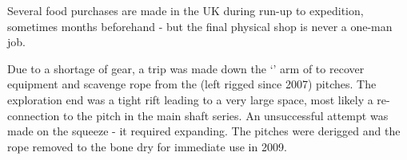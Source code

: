 \begin{marginfigure}
\checkoddpage \ifoddpage \forcerectofloat \else \forceversofloat \fi
\centering
 \caption{Several food purchases are made in the UK during run-up to expedition, sometimes months beforehand - but the final physical shop is never a one-man job. }
 \label{lidl food}
\end{marginfigure}



Due to a shortage of gear, a trip was made down the `' arm of  to recover equipment and scavenge
rope from the (left rigged since 2007) pitches. The exploration end was
a tight rift leading to a very large space, most likely a re-connection
to the  pitch in the main  shaft
series. An unsuccessful attempt was made on the squeeze - it required
expanding. The pitches were derigged and the rope removed to the bone
dry  for immediate use in 2009.

